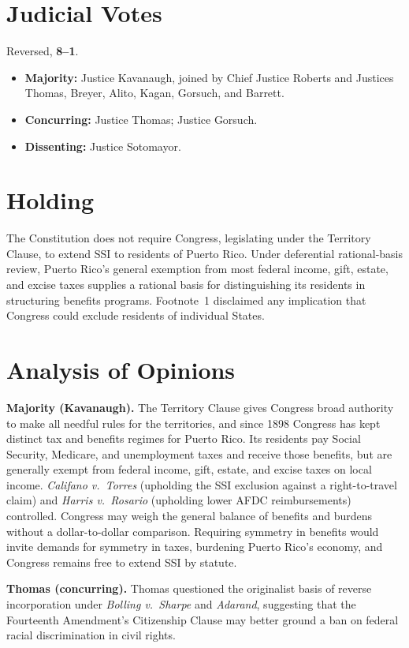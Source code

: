 \documentclass[12pt]{article}
\begin{document}
\section{Judicial Votes}

Reversed, \textbf{8--1}.
\begin{itemize}
\item \textbf{Majority:} Justice Kavanaugh, joined by Chief Justice Roberts and Justices Thomas, Breyer, Alito, Kagan, Gorsuch, and Barrett.
\item \textbf{Concurring:} Justice Thomas; Justice Gorsuch.
\item \textbf{Dissenting:} Justice Sotomayor.
\end{itemize}

\section{Holding}

The Constitution does not require Congress, legislating under the Territory Clause, to extend SSI to residents of Puerto Rico. Under deferential rational-basis review, Puerto Rico's general exemption from most federal income, gift, estate, and excise taxes supplies a rational basis for distinguishing its residents in structuring benefits programs. Footnote~1 disclaimed any implication that Congress could exclude residents of individual States.

\section{Analysis of Opinions}

\textbf{Majority (Kavanaugh).} The Territory Clause gives Congress broad authority to make all needful rules for the territories, and since 1898 Congress has kept distinct tax and benefits regimes for Puerto Rico. Its residents pay Social Security, Medicare, and unemployment taxes and receive those benefits, but are generally exempt from federal income, gift, estate, and excise taxes on local income. \textit{Califano v.\ Torres} (upholding the SSI exclusion against a right-to-travel claim) and \textit{Harris v.\ Rosario} (upholding lower AFDC reimbursements) controlled. Congress may weigh the general balance of benefits and burdens without a dollar-to-dollar comparison. Requiring symmetry in benefits would invite demands for symmetry in taxes, burdening Puerto Rico's economy, and Congress remains free to extend SSI by statute.

\textbf{Thomas (concurring).} Thomas questioned the originalist basis of reverse incorporation under \textit{Bolling v.\ Sharpe} and \textit{Adarand}, suggesting that the Fourteenth Amendment's Citizenship Clause may better ground a ban on federal racial discrimination in civil rights.
\end{document}
